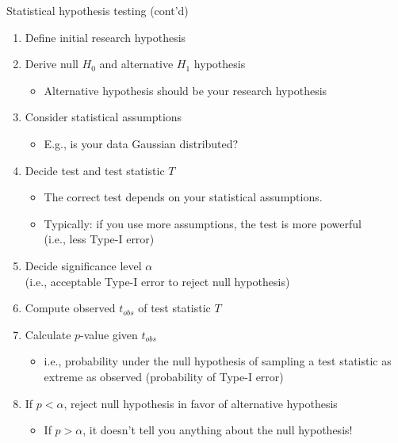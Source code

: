 \begin{frame}[c]{Statistical hypothesis testing (cont'd)}

\begin{enumerate}
  \item Define initial research hypothesis
  \item Derive null $H_0$ and alternative $H_1$ hypothesis
  \begin{itemize}
    \item Alternative hypothesis should be your research hypothesis
  \end{itemize}
  \item Consider statistical assumptions
  \begin{itemize}
    \item E.g., is your data Gaussian distributed?
  \end{itemize}
  \pause
  \item Decide test and test statistic $T$
  \begin{itemize}
    \item The correct test depends on your statistical assumptions.
    \item Typically: if you use more assumptions, the test is more powerful\\ (i.e., less Type-I error)
  \end{itemize}
  \pause
  \item Decide significance level $\alpha$\\ (i.e., acceptable Type-I error to reject null hypothesis)
  \pause
  \item Compute observed $t_{obs}$ of test statistic $T$
  \item Calculate $p$-value given $t_{obs}$
  \begin{itemize}
    \item i.e., probability under the null hypothesis of sampling a test statistic as extreme as observed (probability of Type-I error)
  \end{itemize} 
  \pause
  \item If $p < \alpha$, reject null hypothesis in favor of alternative hypothesis
  \begin{itemize}
    \item If $p > \alpha$, it doesn't tell you anything about the null hypothesis!
  \end{itemize}
\end{enumerate}	

\end{frame}
